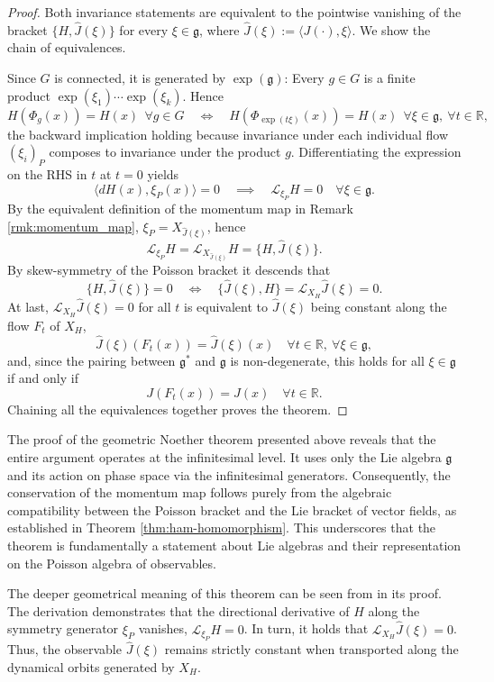 \begin{proof}
	Both invariance statements are equivalent to the pointwise vanishing of the bracket $\{H, \hat{J}(\xi)\}$ for every $\xi \in \mathfrak{g}$, where $\hat{J}(\xi) := \langle J(\cdot), \xi \rangle$. We show the chain of equivalences.
	
	\noindent Since $G$ is connected, it is generated by $\exp(\mathfrak{g})$: Every $g \in G$ is a finite product $\exp(\xi_1)\cdots\exp(\xi_k)$. Hence
	\[
	H(\Phi_g(x)) = H(x) \ \ \forall g \in G
	\quad\Longleftrightarrow\quad
	H(\Phi_{\exp(t\xi)}(x)) = H(x) \ \ \forall \xi \in \mathfrak{g},\ \forall t \in \mathbb{R},
	\]
	the backward implication holding because invariance under each individual flow $(\xi_i)_P$ composes to invariance under the product $g$. Differentiating the expression on the RHS in $t$ at $t=0$ yields
	\[
	\langle dH(x)  , \xi_P(x)  \rangle= 0 \quad \implies \quad \mathscr{L}_{\xi_P} H = 0 \quad \forall \xi \in \mathfrak{g}.
	\]
	By the equivalent definition of the momentum map in Remark \ref{rmk:momentum_map}, $\xi_P = X_{\hat{J}(\xi)}$, hence
	\[
	\mathscr{L}_{\xi_P} H = \mathscr{L}_{X_{\hat{J}(\xi)}} H = \{H, \hat{J}(\xi)\}.
	\]
	By skew-symmetry of the Poisson bracket it descends that
	\[
	\{H, \hat{J}(\xi)\} = 0 \quad\Longleftrightarrow\quad \{\hat{J}(\xi), H\} = \mathscr{L}_{X_H}\hat{J}(\xi) = 0.
	\]
	At last, $\mathscr{L}_{X_H}\hat{J}(\xi) = 0$ for all $t$ is equivalent to $\hat{J}(\xi)$ being constant along the flow $F_t$ of $X_H$,
	\[
	\hat{J}(\xi)(F_t(x)) = \hat{J}(\xi)(x) \quad \forall t \in \mathbb{R}, \ \forall \xi \in \mathfrak{g},
	\]
	and, since the pairing between $\mathfrak{g}^*$ and $\mathfrak{g}$ is non-degenerate, this holds for all $\xi \in \mathfrak{g}$ if and only if
	\[
	J(F_t(x)) = J(x) \quad \forall t \in \mathbb{R}.
	\]
	Chaining all the equivalences together proves the theorem.
\end{proof}

The proof of the geometric Noether theorem presented above reveals that the entire argument operates at the infinitesimal level. It uses only the Lie algebra $\mathfrak{g}$ and its action on phase space via the infinitesimal generators. Consequently, the conservation of the momentum map follows purely from the algebraic compatibility between the Poisson bracket and the Lie bracket of vector fields, as established in Theorem \ref{thm:ham-homomorphism}. This underscores that the theorem is fundamentally a statement about Lie algebras and their representation on the Poisson algebra of observables.

\medskip 

\begin{remark}
	The deeper geometrical meaning of this theorem can be seen from in its proof. The derivation demonstrates that the directional derivative of $H$ along the symmetry generator $\xi_P$ vanishes, $\mathscr{L}_{\xi_P} H = 0$. In turn, it holds that $\mathscr{L}_{X_H} \hat{J}(\xi) = 0$. Thus, the observable $\hat{J}(\xi)$ remains strictly constant when transported along the dynamical orbits generated by $X_H$.
\end{remark}





